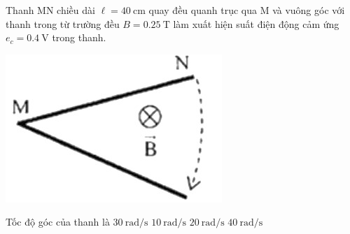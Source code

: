 \begin{ex}
	Thanh MN chiều dài $\ell =\SI{40}{\centi\meter}$ quay đều quanh trục qua M và vuông góc với thanh trong từ trường đều $B = \SI{0.25}{\tesla}$ làm xuất hiện suất điện động cảm ứng $e_c=\SI{0.4}{\volt}$ trong thanh.
	\begin{center}
		\includegraphics[width=0.25\linewidth]{figs/VN12-Y24-PH-SYL-022P-6}
	\end{center}
	Tốc độ góc của thanh là
	\choice
	{$\SI{30}{\radian/\second}$}
	{$\SI{10}{\radian/\second}$}
	{\True $\SI{20}{\radian/\second}$}
	{$\SI{40}{\radian/\second}$}
\end{ex}
